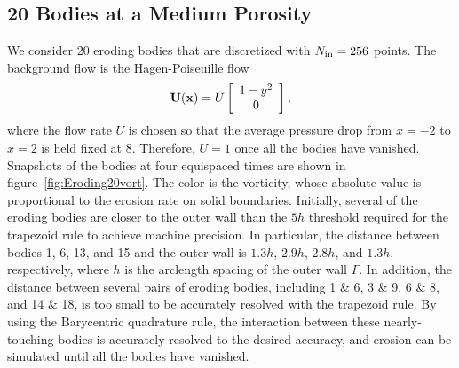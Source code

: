 \documentclass{jfm}
\begin{document}
\subsection{20 Bodies at a Medium Porosity}
\label{sec:Eroding20}
We consider 20 eroding bodies that are discretized with $N_{\mathrm{in}}=256$
points.  The background flow is the Hagen-Poiseuille flow
\begin{align}
  {\mathbf{U}}({\mathbf{x}})=U \left[
  \begin{array}{c}
    1-y^2 \\ 0
  \end{array}
  \right],
\end{align}
where the flow rate $U$ is chosen so that the average pressure drop from
$x=-2$ to $x=2$ is held fixed at 8. Therefore, $U=1$ once all the bodies
have vanished.  Snapshots of the bodies at four equispaced times are
shown in figure~\ref{fig:Eroding20vort}.  The color is the vorticity,
whose absolute value is proportional to the erosion rate on solid
boundaries.  Initially, several of the eroding bodies are closer to the
outer wall than the $5h$ threshold required for the trapezoid rule to
achieve machine precision.  In particular, the distance between bodies
1, 6, 13, and 15 and the outer wall is $1.3h$, $2.9h$, $2.8h$, and
$1.3h$, respectively, where $h$ is the arclength spacing of the outer
wall $\Gamma$.  In addition, the distance between several pairs of
eroding bodies, including 1 \& 6, 3 \& 9, 6 \& 8, and 14 \& 18, is too
small to be accurately resolved with the trapezoid rule.  By using the
Barycentric quadrature rule, the interaction between these
nearly-touching bodies is accurately resolved to the desired accuracy,
and erosion can be simulated until all the bodies have vanished.
\end{document}
